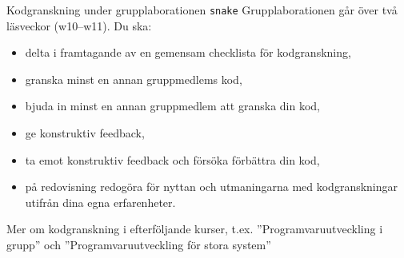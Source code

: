 
\begin{Slide}{Kodgranskning under grupplaborationen \texttt{snake}}
Grupplaborationen  går över två läsveckor (w10--w11). Du ska:
\begin{itemize}
\item delta i framtagande av en gemensam checklista för kodgranskning,
\item granska minst en annan gruppmedlems kod,
\item bjuda in minst en annan gruppmedlem att granska din kod,
\item ge konstruktiv feedback,
\item ta emot konstruktiv feedback och försöka förbättra din kod,
\item på redovisning redogöra för nyttan och utmaningarna med kodgranskningar utifrån dina egna erfarenheter.
\end{itemize}
Mer om kodgranskning i efterföljande kurser, t.ex. ''Programvaruutveckling i grupp'' och ''Programvaruutveckling för stora system''
\end{Slide}
